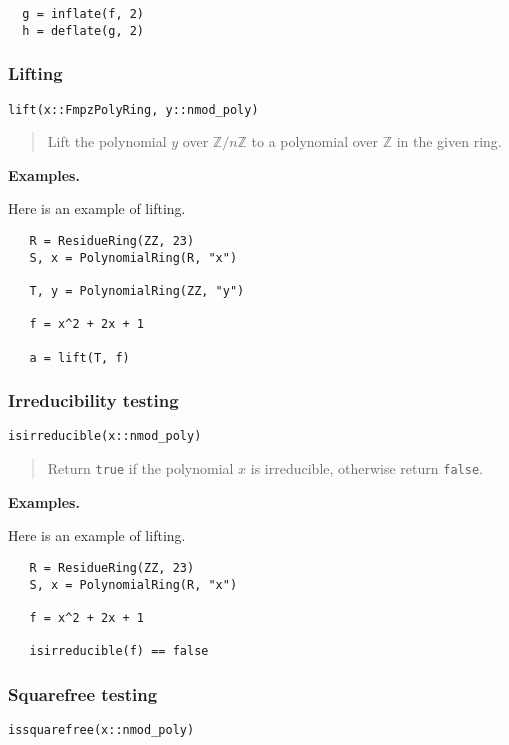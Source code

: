 \documentclass[a4paper,10pt]{article}
\newcommand{\Z}{\mathbb{Z}}
\newcommand{\code}{\lstinline}
\newcommand{\desc}[1]{\vspace{-3mm}\begin{quote}#1\end{quote}}
\begin{document}
{{\begin{lstlisting}
  g = inflate(f, 2)
  h = deflate(g, 2)
\end{lstlisting}

\subsubsection{Lifting}

\begin{lstlisting}
lift(x::FmpzPolyRing, y::nmod_poly)
\end{lstlisting}

\desc{Lift the polynomial $y$ over $\Z/n\Z$ to a polynomial over $\Z$ in the given ring.}

\textbf{Examples.}

Here is an example of lifting.

\begin{lstlisting}
   R = ResidueRing(ZZ, 23)
   S, x = PolynomialRing(R, "x")

   T, y = PolynomialRing(ZZ, "y")

   f = x^2 + 2x + 1

   a = lift(T, f) 
\end{lstlisting}

\subsubsection{Irreducibility testing}

\begin{lstlisting}
isirreducible(x::nmod_poly)
\end{lstlisting}

\desc{Return \code{true} if the polynomial $x$ is irreducible, otherwise return \code{false}.}

\textbf{Examples.}

Here is an example of lifting.

\begin{lstlisting}
   R = ResidueRing(ZZ, 23)
   S, x = PolynomialRing(R, "x")

   f = x^2 + 2x + 1

   isirreducible(f) == false
\end{lstlisting}

\subsubsection{Squarefree testing}

\begin{lstlisting}
issquarefree(x::nmod_poly)
\end{lstlisting}

}}
\end{document}
